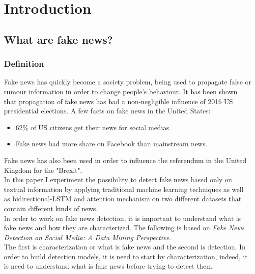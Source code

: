 ﻿\chapter{Introduction} \label{section:intro}
\section{What are fake news?}
\subsection{Definition}
Fake news has quickly become a society problem, being used to propagate false or rumour information in order to change people’s behaviour. It has been shown that propagation of fake news has had a non-negligible influence of 2016 US presidential elections\cite{Allcott2017}. A few facts on fake news in the United States: 
\begin{itemize}
 \item $62\%$ of US citizens get their news for social medias\cite{gottfried2016news}
 \item Fake news had more share on Facebook than mainstream news\cite{silverman2016teens}.
\end{itemize}
Fake news has also been used in order to influence the referendum in the United Kingdom for the "Brexit". \\

In this paper I experiment the possibility to detect fake news based only on textual information by applying traditional machine learning techniques\cite{Fan2008LIBLINEARAL,Robertson2004,zhang_optimality_nodate} as well as bidirectional-LSTM\cite{Hochreiter1997LongSM} and attention mechanism\cite{zhou-etal-2016-attention} on two different datasets that contain different kinds of news.\\

In order to work on fake news detection, it is important to understand what is fake news and how they are characterized. The following is based on \textit{Fake News Detection on Social Media: A Data Mining Perspective}\cite{shu2017fake}.\\

The first is characterization or what is fake news and the second is detection. In order to build detection models, it is need to start by characterization, indeed, it is need to understand what is fake news before trying to detect them. \\

